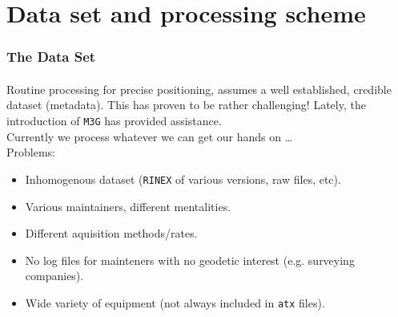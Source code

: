 
\section{Data set and processing scheme}

\begin{frame}\frametitle{The Data Set}\framesubtitle{}
\vskip-1.5cm
  Routine processing for precise positioning, assumes a well established, 
  credible dataset (metadata). This has proven to be rather challenging! Lately, 
  the introduction of \texttt{M3G} has provided assistance.\\
  \bigskip
  Currently we process whatever we can get our hands on \ldots\\
  Problems:
  \begin{itemize}
    \item Inhomogenous dataset (\texttt{RINEX} of various versions, raw files, etc).
    \item Various maintainers, different mentalities.
    \item Different aquisition methods/rates.
    \item No log files for mainteners with no geodetic interest (e.g. surveying companies).
    \item Wide variety of equipment (not always included in \texttt{atx} files).
  \end{itemize}
\end{frame}
\note


